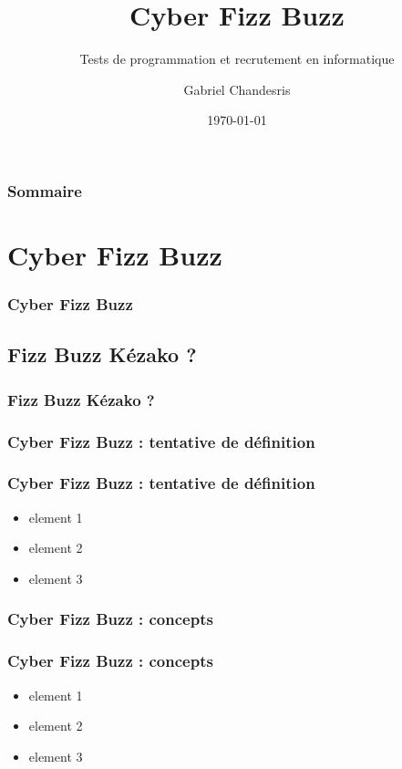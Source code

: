 \documentclass[slidetop,11pt]{beamer}
\title{Cyber Fizz Buzz}
\subtitle{Tests de programmation et recrutement en informatique}
\author{Gabriel Chandesris}
\institute{\emph{to be defined}}
\date{\today} %
\begin{document}
\frame[plain]{\titlepage } 
%


\begin{frame}
	\frametitle{Sommaire}
	\small \tableofcontents[hideallsubsections]
\end{frame} 

\section{Cyber Fizz Buzz}
\begin{frame}
	\frametitle{Cyber Fizz Buzz}
	\tableofcontents[sections=1,currentsection,subsectionstyle=show/shaded/hide] %
\end{frame} 

\subsection{Fizz Buzz K{\'e}zako ?}
\begin{frame}
	\frametitle{Fizz Buzz K{\'e}zako ?}
	\tableofcontents[sections=1,currentsection,subsectionstyle=show/shaded/hide]
\end{frame} 

\subsubsection{Cyber Fizz Buzz : tentative de d{\'e}finition}
\begin{frame}
	\frametitle{Cyber Fizz Buzz : tentative de d{\'e}finition}
	\begin{itemize}
		\item element 1
		\item element 2
		\item element 3
	\end{itemize}
\end{frame}

\subsubsection{Cyber Fizz Buzz : concepts}
\begin{frame}
	\frametitle{Cyber Fizz Buzz : concepts}
	\begin{itemize}
		\item element 1
		\item element 2
		\item element 3
	\end{itemize}
\end{frame} 
\end{document}

